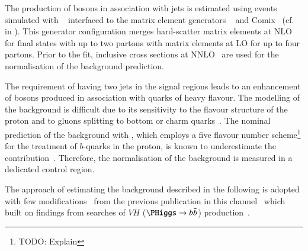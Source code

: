 %
%

The production of \PZ bosons in association with jets is estimated
using events simulated with \SHERPA[2.2.1]~\cite{Bothmann:2019yzt}
interfaced to the matrix element generators
\OPENLOOPS~\cite{Buccioni:2019sur,Cascioli:2011va,Denner:2016kdg} and
Comix~\cite{Gleisberg:2008fv} (cf.\  in
). This generator configuration merges
hard-scatter matrix elements at NLO for final states with up to two
partons with matrix elements at LO for up to four partons. Prior to
the fit, inclusive \Zjets cross sections at
NNLO~\cite{Anastasiou:2003ds} are used for the normalisation of the
background prediction.

The requirement of having two \btagged jets in the signal regions
leads to an enhancement of \PZ bosons produced in association with
quarks of heavy flavour. The modelling of the \ZHF background is
difficult due to its sensitivity to the flavour structure of the
proton and to gluons splitting to bottom or charm
quarks~\cite{Maltoni:2012pa,Napoletano:2018euk,Napoletano:2019tla}. The
nominal prediction of the \ZHF background with \SHERPA, which employs
a five flavour number scheme\footnote{TODO: Explain} for the treatment
of $b$-quarks in the proton, is known to underestimate the \ZHF
contribution~\cite{STDM-2017-38}.
Therefore, the normalisation of the \ZHF background is measured in a
dedicated control region.


The approach of estimating the \ZHF background described in the
following is adopted with few modifications~\cite{bokan} from the
previous publication in this channel~\cite{HIGG-2016-16-witherratum}
which built on findings from searches of $VH$ ($\PHiggs \to \bbbar$)
production~\cite{HIGG-2016-29}.

